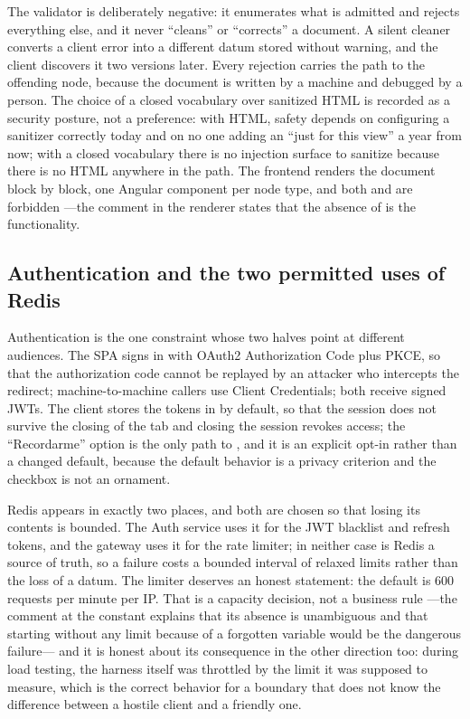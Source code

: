 The validator is deliberately negative: it enumerates what is admitted and rejects everything
else, and it never \enquote{cleans} or \enquote{corrects} a document. A silent cleaner converts a
client error into a different datum stored without warning, and the client discovers it two
versions later. Every rejection carries the path to the offending node, because the document is
written by a machine and debugged by a person. The choice of a closed vocabulary over sanitized
HTML is recorded as a security posture, not a preference: with HTML, safety depends on configuring
a sanitizer correctly today and on no one adding an \code{[innerHTML]} \enquote{just for this
view} a year from now; with a closed vocabulary there is no injection surface to sanitize because
there is no HTML anywhere in the path. The frontend renders the document block by block, one
Angular component per node type, and both  and  are
forbidden —the comment in the renderer states that the absence of \code{[innerHTML]} is the
functionality.

\subsection{Authentication and the two permitted uses of Redis}

Authentication is the one constraint whose two halves point at different audiences. The SPA signs
in with OAuth2 Authorization Code plus PKCE, so that the authorization code cannot be replayed by
an attacker who intercepts the redirect; machine-to-machine callers use Client Credentials; both
receive signed JWTs. The client stores the tokens in  by default, so that the
session does not survive the closing of the tab and closing the session revokes access; the
\enquote{Recordarme} option is the only path to , and it is an explicit opt-in
rather than a changed default, because the default behavior is a privacy criterion and the
checkbox is not an ornament.

Redis appears in exactly two places, and both are chosen so that losing its contents is bounded.
The Auth service uses it for the JWT blacklist and refresh tokens, and the gateway uses it for the
rate limiter; in neither case is Redis a source of truth, so a failure costs a bounded interval of
relaxed limits rather than the loss of a datum. The limiter deserves an honest statement: the
default is 600 requests per minute per IP. That is a capacity decision, not a business rule —the
comment at the constant explains that its absence is unambiguous and that starting without any
limit because of a forgotten variable would be the dangerous failure— and it is honest about its
consequence in the other direction too: during load testing, the harness itself was throttled by
the limit it was supposed to measure, which is the correct behavior for a boundary that does not
know the difference between a hostile client and a friendly one.

